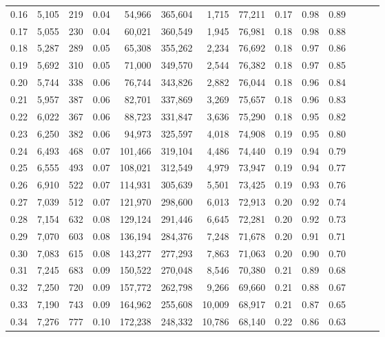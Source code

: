 \begin{tabular}{rrrrrrrrrrrrrr}
0.16 &  5,105 &    219 &  0.04 &   54,966 &  365,604 &   1,715 &  77,211 &  0.17 &  0.98 &      0.89 \\
0.17 &  5,055 &    230 &  0.04 &   60,021 &  360,549 &   1,945 &  76,981 &  0.18 &  0.98 &      0.88 \\
0.18 &  5,287 &    289 &  0.05 &   65,308 &  355,262 &   2,234 &  76,692 &  0.18 &  0.97 &      0.86 \\
0.19 &  5,692 &    310 &  0.05 &   71,000 &  349,570 &   2,544 &  76,382 &  0.18 &  0.97 &      0.85 \\
0.20 &  5,744 &    338 &  0.06 &   76,744 &  343,826 &   2,882 &  76,044 &  0.18 &  0.96 &      0.84 \\
0.21 &  5,957 &    387 &  0.06 &   82,701 &  337,869 &   3,269 &  75,657 &  0.18 &  0.96 &      0.83 \\
0.22 &  6,022 &    367 &  0.06 &   88,723 &  331,847 &   3,636 &  75,290 &  0.18 &  0.95 &      0.82 \\
0.23 &  6,250 &    382 &  0.06 &   94,973 &  325,597 &   4,018 &  74,908 &  0.19 &  0.95 &      0.80 \\
0.24 &  6,493 &    468 &  0.07 &  101,466 &  319,104 &   4,486 &  74,440 &  0.19 &  0.94 &      0.79 \\
0.25 &  6,555 &    493 &  0.07 &  108,021 &  312,549 &   4,979 &  73,947 &  0.19 &  0.94 &      0.77 \\
0.26 &  6,910 &    522 &  0.07 &  114,931 &  305,639 &   5,501 &  73,425 &  0.19 &  0.93 &      0.76 \\
0.27 &  7,039 &    512 &  0.07 &  121,970 &  298,600 &   6,013 &  72,913 &  0.20 &  0.92 &      0.74 \\
0.28 &  7,154 &    632 &  0.08 &  129,124 &  291,446 &   6,645 &  72,281 &  0.20 &  0.92 &      0.73 \\
0.29 &  7,070 &    603 &  0.08 &  136,194 &  284,376 &   7,248 &  71,678 &  0.20 &  0.91 &      0.71 \\
0.30 &  7,083 &    615 &  0.08 &  143,277 &  277,293 &   7,863 &  71,063 &  0.20 &  0.90 &      0.70 \\
0.31 &  7,245 &    683 &  0.09 &  150,522 &  270,048 &   8,546 &  70,380 &  0.21 &  0.89 &      0.68 \\
0.32 &  7,250 &    720 &  0.09 &  157,772 &  262,798 &   9,266 &  69,660 &  0.21 &  0.88 &      0.67 \\
0.33 &  7,190 &    743 &  0.09 &  164,962 &  255,608 &  10,009 &  68,917 &  0.21 &  0.87 &      0.65 \\
0.34 &  7,276 &    777 &  0.10 &  172,238 &  248,332 &  10,786 &  68,140 &  0.22 &  0.86 &      0.63 \\

\end{tabular}
